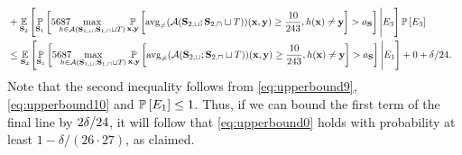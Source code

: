 \begin{proofof}{}
\begin{align}
    \\
    &+
    \e_{\rS_{2}}\left[\p_{\rS_{1}}\left[5687\negmedspace\negmedspace\negmedspace\negmedspace\negmedspace\negmedspace\max_{h\in \erm(\rS_{1,\sqcup};\rS_{1,\sqcap}\sqcup T)}\p_{\rx,\ry}\left[\avg(\erm(\rS_{2,\sqcup};\rS_{2,\sqcap}\sqcup T))(\rx,\ry)\geq \frac{10}{243},h(\rx)\not=\ry\right] >a_{\rS}\right]\Bigg| E_{3} \right]\p\left[E_{3}\right]\nonumber
    \\
    &\leq\e_{\rS_{2}}\left[\p_{\rS_{1}}\left[5687\negmedspace\negmedspace\negmedspace\negmedspace\negmedspace\negmedspace\max_{h\in \erm(\rS_{1,\sqcup};\rS_{1,\sqcap}\sqcup T)}\p_{\rx,\ry}\left[\avg(\erm(\rS_{2,\sqcup};\rS_{2,\sqcap}\sqcup T))(\rx,\ry)\geq \frac{10}{243},h(\rx)\not=\ry\right] >a_{\rS}\right]\Bigg| E_{1}\right]
    +0 
    +\delta/\ch .\nonumber
\end{align} 
Note that the second inequality follows from \cref{eq:upperbound9}, \cref{eq:upperbound10} and $ \operatorname*{\mathbb{P}}\left[E_{1}\right] \leq 1$.
Thus, if we can bound the first term of the final line by $ 2\delta/24 $, it will follow that \cref{eq:upperbound0} holds with probability at least $ 1-\delta/(26\cdot27) $, as claimed.


\end{proofof}
